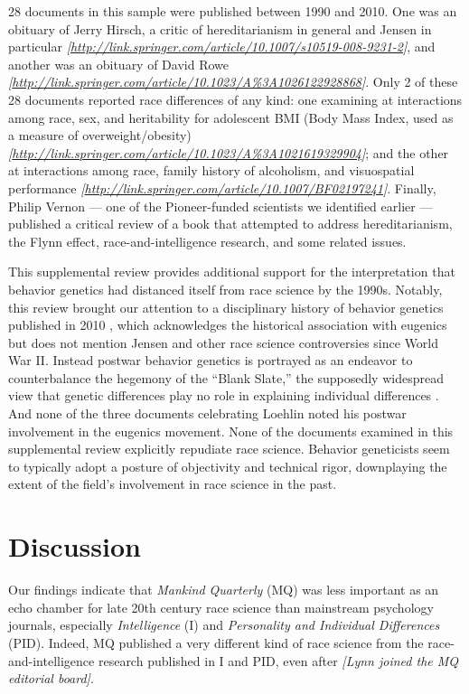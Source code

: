 \documentclass[12pt]{article}
\begin{document}
28 documents in this sample were published between 1990 and 2010. One was an obituary of Jerry Hirsch, a critic of hereditarianism in general and Jensen in particular \emph{{[}\url{http://link.springer.com/article/10.1007/s10519-008-9231-2}{]}}, and another was an obituary of David Rowe \emph{{[}\url{http://link.springer.com/article/10.1023/A\%3A1026122928868}{]}}. Only 2 of these 28 documents reported race differences of any kind: one examining at interactions among race, sex, and heritability for adolescent BMI (Body Mass Index, used as a measure of overweight/obesity) \emph{{[}\url{http://link.springer.com/article/10.1023/A\%3A1021619329904}{]}}; and the other at interactions among race, family history of alcoholism, and visuospatial performance \emph{{[}\url{http://link.springer.com/article/10.1007/BF02197241}{]}}. Finally, Philip Vernon --- one of the Pioneer-funded scientists we identified earlier --- published a critical review of a book that attempted to address hereditarianism, the Flynn effect, race-and-intelligence research, and some related issues.

This supplemental review provides additional support for the interpretation that behavior genetics had distanced itself from race science by the 1990s. Notably, this review brought our attention to a disciplinary history of behavior genetics published in 2010 \cite{McGueEndBehavioralGenetics2010}, which acknowledges the historical association with eugenics but does not mention Jensen and other race science controversies since World War II. Instead postwar behavior genetics is portrayed as an endeavor to counterbalance the hegemony of the ``Blank Slate,'' the supposedly widespread view that genetic differences play no role in explaining individual differences \cite{BatesonCorpseWearisomeDebate2002}. And none of the three documents celebrating Loehlin noted his postwar involvement in the eugenics movement. None of the documents examined in this supplemental review explicitly repudiate race science. Behavior geneticists seem to typically adopt a posture of objectivity and technical rigor, downplaying the extent of the field's involvement in race science in the past.

\hypertarget{discussion}{%
\section*{Discussion}\label{discussion}}

Our findings indicate that \emph{Mankind Quarterly} (MQ) was less important as an echo chamber for late 20th century race science than mainstream psychology journals, especially \emph{Intelligence} (I) and \emph{Personality and Individual Differences} (PID). Indeed, MQ published a very different kind of race science from the race-and-intelligence research published in I and PID, even after \emph{{[}Lynn joined the MQ editorial board{]}}.
\end{document}
